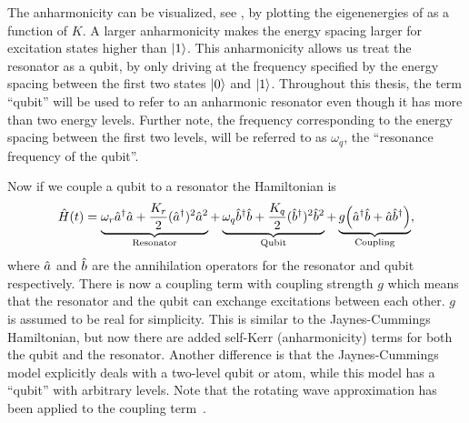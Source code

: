 \documentclass[main.tex]{subfiles}
\begin{document}
The anharmonicity can be visualized, see , by plotting the eigenenergies of  as a function of \( K \).
A larger anharmonicity makes the energy spacing larger for excitation states higher than \(\ket{1}\).
This anharmonicity allows us treat the resonator as a qubit, by only driving at the frequency specified by the energy spacing between the first two states \( \ket{0} \) and \( \ket{1} \).
Throughout this thesis, the term ``qubit'' will be used to refer to an anharmonic resonator even though it has more than two energy levels.
Further note, the frequency corresponding to the energy spacing between the first two levels, will be referred to as \( \omega_{q} \), the ``resonance frequency of the qubit''.


Now if we couple a qubit to a resonator the Hamiltonian is
\begin{equation}
    \hat{H}(t) = \underbrace{\omega_{r}\hat{a}^\dagger\hat{a} + \frac{K_r}{2}(\hat{a}^\dagger)^2\hat{a}^2}_{\text{Resonator}} + \underbrace{\omega_{q}\hat{b}^\dagger\hat{b} + \frac{K_q}{2}(\hat{b}^\dagger)^2\hat{b}^2}_{\text{Qubit}} + \underbrace{g\qty(\hat{a}^\dagger\hat{b}+\hat{a}\hat{b}^\dagger)}_{\text{Coupling}},
    \label{eq:hamiltonian-coupled}
\end{equation}
where \( \hat{a} \) and \( \hat{b} \) are the annihilation operators for the resonator and qubit respectively.
There is now a coupling term with coupling strength \(g\) which means that the resonator and the qubit can exchange excitations between each other.
\(g\) is assumed to be real for simplicity.
This is similar to the Jaynes-Cummings Hamiltonian, but now there are added self-Kerr (anharmonicity) terms for both the qubit and the resonator.
Another difference is that the Jaynes-Cummings model explicitly deals with a two-level qubit or atom, while this model has a ``qubit'' with arbitrary levels.
Note that the rotating wave approximation has been applied to the coupling term~\cite{wu_strong-coupling_2007}.
\end{document}
